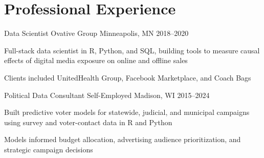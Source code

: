 \section{Professional Experience}

\cventry
  {Data Scientist}
  {Ovative Group}
  {Minneapolis, MN}
  {2018--2020}
  {\item Full-stack data scientist in R, Python, and SQL, building tools to measure causal effects of digital media exposure on online and offline sales
   \item Clients included UnitedHealth Group, Facebook Marketplace, and Coach Bags}

\cventry
  {Political Data Consultant}
  {Self-Employed}
  {Madison, WI}
  {2015--2024}
  {\item Built predictive voter models for statewide, judicial, and municipal campaigns using survey and voter-contact data in R and Python
   \item Models informed budget allocation, advertising audience prioritization, and strategic campaign decisions}
